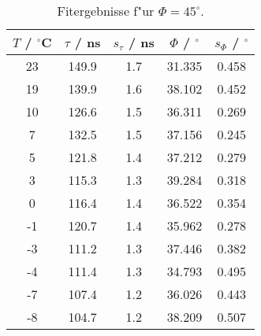 \begin{table}[H]
\caption{Fitergebnisse f"ur $\Phi=45^\circ$.}
\begin{center}
\begin{tabular}{|c|c|c|c|c|}
  \hline
  $T$ / ${}^{\circ}$C & $\tau$ / ns & $s_{\tau}$ / ns & $\Phi$ / ${}^{\circ}$ & $s_{\Phi}$ / ${}^{\circ}$ \\ \hline
  23 & 149.9 & 1.7 & 31.335 & 0.458 \\ \hline
  19 & 139.9 & 1.6 & 38.102 & 0.452 \\ \hline
  10 & 126.6 & 1.5 & 36.311 & 0.269 \\ \hline
  7 & 132.5 & 1.5 & 37.156 & 0.245 \\ \hline
  5 & 121.8 & 1.4 & 37.212 & 0.279 \\ \hline
  3 & 115.3 & 1.3 & 39.284 & 0.318 \\ \hline
  0 & 116.4 & 1.4 & 36.522 & 0.354 \\ \hline
  -1 & 120.7 & 1.4 & 35.962 & 0.278 \\ \hline
  -3 & 111.2 & 1.3 & 37.446 & 0.382 \\ \hline
  -4 & 111.4 & 1.3 & 34.793 & 0.495 \\ \hline
  -7 & 107.4 & 1.2 & 36.026 & 0.443 \\ \hline
  -8 & 104.7 & 1.2 & 38.209 & 0.507 \\ \hline
\end{tabular}
\end{center}
\label{tab:phi:45}
\end{table}
